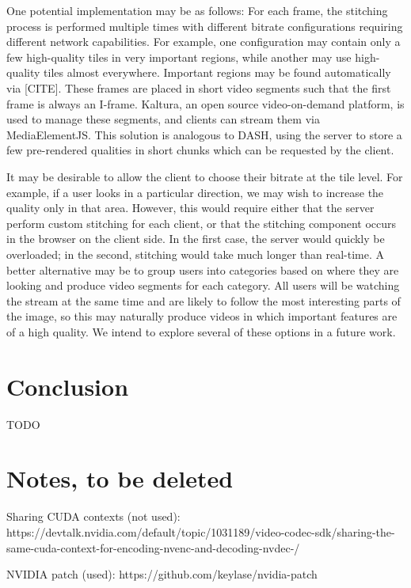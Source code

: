 One potential implementation may be as follows: For each frame, the stitching process is performed multiple times with different bitrate configurations requiring different network capabilities. For example, one configuration may contain only a few high-quality tiles in very important regions, while another may use high-quality tiles almost everywhere. Important regions may be found automatically via [CITE]. These frames are placed in short video segments such that the first frame is always an I-frame. Kaltura, an open source video-on-demand platform, is used to manage these segments, and clients can stream them via MediaElementJS. This solution is analogous to DASH, using the server to store a few pre-rendered qualities in short chunks which can be requested by the client.

It may be desirable to allow the client to choose their bitrate at the tile level. For example, if a user looks in a particular direction, we may wish to increase the quality only in that area. However, this would require either that the server perform custom stitching for each client, or that the stitching component occurs in the browser on the client side. In the first case, the server would quickly be overloaded; in the second, stitching would take much longer than real-time. A better alternative may be to group users into categories based on where they are looking and produce video segments for each category. All users will be watching the stream at the same time and are likely to follow the most interesting parts of the image, so this may naturally produce videos in which important features are of a high quality. We intend to explore several of these options in a future work.

\section{Conclusion} \label{concl}

TODO

\section{Notes, to be deleted}
Sharing CUDA contexts (not used): https://devtalk.nvidia.com/default/topic/1031189/video-codec-sdk/sharing-the-same-cuda-context-for-encoding-nvenc-and-decoding-nvdec-/

NVIDIA patch (used): https://github.com/keylase/nvidia-patch

